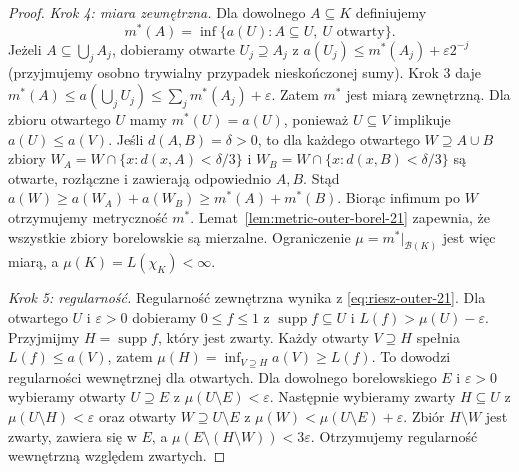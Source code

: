 \begin{proof}
\emph{Krok 4: miara zewnętrzna.}
Dla dowolnego $A\subseteq K$ definiujemy
\begin{equation}\label{eq:riesz-outer-21}
 m^*(A)=\inf\{a(U):A\subseteq U,\ U\text{ otwarty}\}.
\end{equation}
Jeżeli $A\subseteq\bigcup_j A_j$, dobieramy otwarte
$U_j\supseteq A_j$ z
$a(U_j)\le m^*(A_j)+\varepsilon2^{-j}$ (przyjmujemy
osobno trywialny przypadek nieskończonej sumy).
Krok 3 daje
$m^*(A)\le a(\bigcup_jU_j)\le\sum_jm^*(A_j)+\varepsilon$.
Zatem $m^*$ jest miarą zewnętrzną.
Dla zbioru otwartego $U$ mamy $m^*(U)=a(U)$, ponieważ
$U\subseteq V$ implikuje $a(U)\le a(V)$.
Jeśli $d(A,B)=\delta>0$, to dla każdego otwartego
$W\supseteq A\cup B$ zbiory
$W_A=W\cap\{x:d(x,A)<\delta/3\}$ i
$W_B=W\cap\{x:d(x,B)<\delta/3\}$ są otwarte,
rozłączne i zawierają odpowiednio $A,B$. Stąd
$a(W)\ge a(W_A)+a(W_B)\ge m^*(A)+m^*(B)$.
Biorąc infimum po $W$ otrzymujemy metryczność $m^*$.
Lemat~\ref{lem:metric-outer-borel-21} zapewnia, że
wszystkie zbiory borelowskie są mierzalne. Ograniczenie
$\mu=m^*|_{\mathcal B(K)}$ jest więc miarą, a
$\mu(K)=L(\chi_K)<\infty$.

\emph{Krok 5: regularność.}
Regularność zewnętrzna wynika z \eqref{eq:riesz-outer-21}.
Dla otwartego $U$ i $\varepsilon>0$ dobieramy
$0\le f\le1$ z $\operatorname{supp}f\subseteq U$ i
$L(f)>\mu(U)-\varepsilon$. Przyjmijmy
$H=\operatorname{supp}f$, który jest zwarty.
Każdy otwarty $V\supseteq H$ spełnia
$L(f)\le a(V)$, zatem
$\mu(H)=\inf_{V\supseteq H}a(V)\ge L(f)$.
To dowodzi regularności wewnętrznej dla otwartych.
Dla dowolnego borelowskiego $E$ i $\varepsilon>0$
wybieramy otwarty $U\supseteq E$ z
$\mu(U\setminus E)<\varepsilon$.
Następnie wybieramy zwarty $H\subseteq U$ z
$\mu(U\setminus H)<\varepsilon$ oraz otwarty
$W\supseteq U\setminus E$ z
$\mu(W)<\mu(U\setminus E)+\varepsilon$.
Zbiór $H\setminus W$ jest zwarty, zawiera się w $E$,
a $\mu(E\setminus(H\setminus W))<3\varepsilon$.
Otrzymujemy regularność wewnętrzną względem zwartych.


\end{proof}

